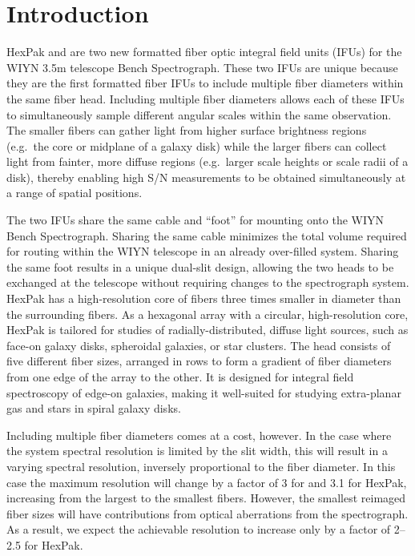 \section{Introduction}
\label{GPB:sec:intro}
HexPak and \GP are two new formatted fiber optic integral field units
(IFUs) for the WIYN 3.5m telescope Bench Spectrograph\footnotemark.
  These two IFUs are unique because they are
the first formatted fiber IFUs to include multiple fiber diameters within the
same fiber head.  Including multiple fiber diameters allows each of these IFUs
to simultaneously sample different angular scales within the same observation.
The smaller fibers can gather light from higher surface brightness regions
(e.g.\ the core or midplane of a galaxy disk) while the larger fibers can
collect light from fainter, more diffuse regions (e.g.\ larger scale heights
or scale radii of a disk), thereby enabling high S/N measurements to be
obtained simultaneously at a range of spatial positions.


The two IFUs share the same cable and ``foot'' for mounting onto the WIYN
Bench Spectrograph.  Sharing the same cable minimizes the total volume
required for routing within the WIYN telescope in an already over-filled
system.  Sharing the same foot results in a unique dual-slit design, allowing
the two heads to be exchanged at the telescope without requiring changes to
the spectrograph system.  HexPak has a high-resolution core of fibers three
times smaller in diameter than the surrounding fibers.  As a hexagonal array
with a circular, high-resolution core, HexPak is tailored for studies of
radially-distributed, diffuse light sources, such as face-on galaxy disks,
spheroidal galaxies, or star clusters.  The \GP head consists of five
different fiber sizes, arranged in rows to form a gradient of fiber diameters
from one edge of the array to the other.  It is designed for integral field
spectroscopy of edge-on galaxies, making it well-suited for studying
extra-planar gas and stars in spiral galaxy disks.


Including multiple fiber diameters comes at a cost, however.  In the case
where the system spectral resolution is limited by the slit width, this will
result in a varying spectral resolution, inversely proportional to the fiber
diameter.  In this case the maximum resolution will change by a factor of 3
for \GP and 3.1 for HexPak, increasing from the largest to the smallest
fibers.  However, the smallest reimaged fiber sizes will have contributions
from optical aberrations from the spectrograph. As a result, we expect the
achievable resolution to increase only by a factor of 2--2.5 for HexPak.

